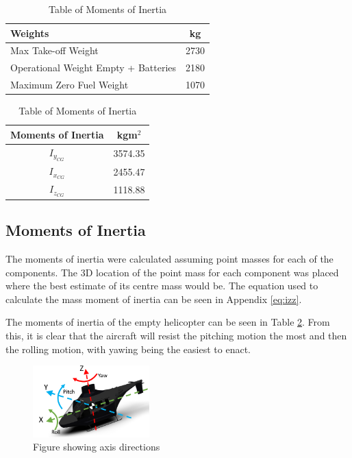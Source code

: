 \documentclass[11pt,a4paper]{article}
\begin{document}
\begin{table}[H]
	\begin{minipage}{0.5\linewidth}
	\caption{Table of key weights}
		\label{tab:tabmass}
		\centering
\begin{tabular}{lc}
    \hline
    \rowcolor[HTML]{DAE8FC} 
    Weights       & kg   \\ \hline
    Max Take-off Weight          & 2730 \\ \hline
    Operational Weight Empty + Batteries & 2180 \\ \hline
    Maximum Zero Fuel Weight         & 1070 \\ \hline
\end{tabular}
	\end{minipage}\hfill
	\begin{minipage}{0.48\linewidth}
\centering
\caption{Table of Moments of Inertia}
		\label{tab:tabinertia}
\begin{tabular}{cc}
\hline
\rowcolor[HTML]{DAE8FC} 
Moments of Inertia & kgm$^2$   \\ \hline
$I_{y_{CG}}$        & 3574.35 \\ \hline
$I_{x_{CG}}$        & 2455.47 \\ \hline
$I_{z_{CG}}$        & 1118.88 \\ \hline
\end{tabular}

	\end{minipage}
\end{table}
\subsection{Moments of Inertia}
The moments of inertia were calculated assuming point masses for each of the components. The 3D location of the point mass for each component was placed where the best estimate of its centre mass would be. The equation used to calculate the mass moment of inertia can be seen in Appendix \ref{eq:izz}.

The moments of inertia of the empty helicopter can be seen in Table \ref{tab:tabinertia}. From this, it is clear that the aircraft will resist the pitching motion the most and then the rolling motion, with yawing being the easiest to enact.

\begin{figure}[H]
    \centering
    \includegraphics[width=0.4\textwidth]{AXIS.PNG}
    \caption{Figure showing axis directions}
    \label{fig:axis}
\end{figure}{}
\end{document}
